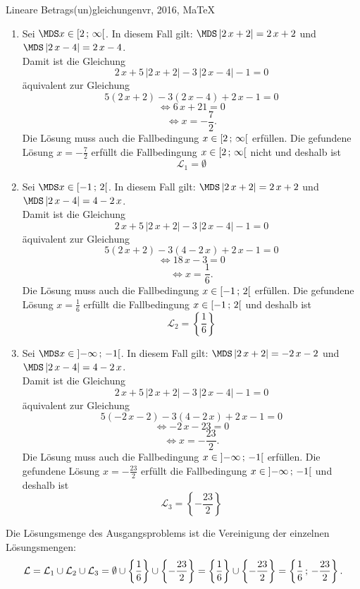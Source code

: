 \begin{MAufgabe}{Lineare Betrags(un)gleichungen}{vr, 2016, MaTeX}
 \begin{enumerate} 
 \item Sei $ \MDS x\in[ 2 \, \MIntvlSep \, \infty\MoIr $. 
 In diesem Fall gilt: 
  $ \MDS \left| 2\, x + 2\right|=2\, x + 2$ und $ \MDS \left| 2\, x - 4\right|=2\, x - 4$. \\ 
 Damit ist die Gleichung 
 $$ 
2\, x + 5\, \left|2\, x + 2\right| - 3\, \left|2\, x - 4\right| - 1= 0
$$
 \"aquivalent zur Gleichung
 $$ 
5\left(2\, x + 2\right)-3\left( 2\, x - 4\right)+2\, x-1= 0 
$$  
$$ 
 \Leftrightarrow 6\, x + 21= 0 
$$  
$$ \Leftrightarrow x = - \frac{7}{2} . 
 $$ 
 Die L\"osung muss auch die Fallbedingung $x\in [ 2 \, ; \, \infty[\mbox{}  $ erf\"ullen. Die gefundene L\"osung $x=- \frac{7}{2}$ erf\"ullt die Fallbedingung  $x\in [ 2 \, ; \, \infty[\mbox{} $ nicht und deshalb ist  $$
 \mathcal{L}_{1}=\emptyset 
 $$ 
\item Sei $ \MDS x\in[ -1 \, \MIntvlSep \, 2\MoIr $. 
 In diesem Fall gilt: 
  $ \MDS \left| 2\, x + 2\right|=2\, x + 2$ und $ \MDS \left| 2\, x - 4\right|=4 - 2\, x$. \\ 
 Damit ist die Gleichung 
 $$ 
2\, x + 5\, \left|2\, x + 2\right| - 3\, \left|2\, x - 4\right| - 1= 0
$$
 \"aquivalent zur Gleichung
 $$ 
5\left(2\, x + 2\right)-3\left( 4 - 2\, x\right)+2\, x-1= 0 
$$  
$$ 
 \Leftrightarrow 18\, x - 3= 0 
$$  
$$ \Leftrightarrow x = \frac{1}{6} . 
 $$ 
 Die L\"osung muss auch die Fallbedingung $x\in [ -1 \, ; \, 2[\mbox{}  $ erf\"ullen. Die gefundene L\"osung $x=\frac{1}{6}$ erf\"ullt die Fallbedingung  $x\in [ -1 \, ; \, 2[\mbox{} $ und deshalb ist  $$
 \mathcal{L}_{2}=\left\{\frac{1}{6}\right\}
 $$ 
\item Sei $ \MDS x\in\MoIl  -\infty \, \MIntvlSep \, -1\MoIr $. 
 In diesem Fall gilt: 
  $ \MDS \left| 2\, x + 2\right|= - 2\, x - 2$ und $ \MDS \left| 2\, x - 4\right|=4 - 2\, x$. \\ 
 Damit ist die Gleichung 
 $$ 
2\, x + 5\, \left|2\, x + 2\right| - 3\, \left|2\, x - 4\right| - 1= 0
$$
 \"aquivalent zur Gleichung
 $$ 
5\left( - 2\, x - 2\right)-3\left( 4 - 2\, x\right)+2\, x-1= 0 
$$  
$$ 
 \Leftrightarrow  - 2\, x - 23= 0 
$$  
$$ \Leftrightarrow x = - \frac{23}{2} . 
 $$ 
 Die L\"osung muss auch die Fallbedingung $x\in \mbox{}]\mathopen{}  -\infty \, ; \, -1[\mbox{}  $ erf\"ullen. Die gefundene L\"osung $x=- \frac{23}{2}$ erf\"ullt die Fallbedingung  $x\in \mbox{}]\mathopen{}  -\infty \, ; \, -1[\mbox{} $ und deshalb ist  $$
 \mathcal{L}_{3}=\left\{- \frac{23}{2}\right\}
 $$ 
 \end{enumerate} 
  Die L\"osungsmenge des Ausgangsproblems ist die Vereinigung der einzelnen L\"osungsmengen: 
$$ \mathcal{L} = \mathcal{L}_{1} \cup \mathcal{L}_{2} \cup \mathcal{L}_{3} 
 = \emptyset\cup \left\{\frac{1}{6}\right\}\cup \left\{- \frac{23}{2}\right\} 
  =\left\{\frac{1}{6}\right\}\cup\left\{- \frac{23}{2}\right\} 
  = \left\{\frac{1}{6}\, ; \,- \frac{23}{2}\right\} 
 . $$ 
 

\end{MAufgabe}
